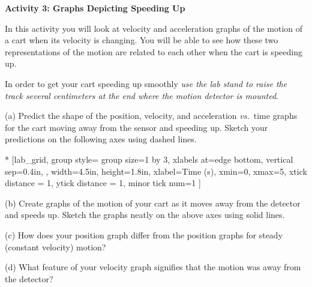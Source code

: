 \pagebreak[2]
\textbf{Activity 3: Graphs Depicting Speeding Up} 

In this activity you will look at velocity and acceleration graphs of the
motion of a cart when its velocity is changing. You will be able to see how
these two representations of the motion are related to each other when the cart
is speeding up.

In order to get your cart speeding up smoothly \textit{use the lab stand to raise the
track several centimeters at the end where the motion detector is mounted}.

(a) Predict the shape of the position, velocity, and acceleration \textit{vs.}~time graphs
for the cart moving away from the sensor and speeding up. Sketch your predictions
on the following axes using dashed lines.



\begin{lab_groupplot}*{}
					[lab_grid,
	group style={
		group size=1 by 3,
		xlabels at=edge bottom,
		vertical sep=0.4in,
		},
	width=4.5in,  height=1.8in,
	xlabel=Time (s),
	xmin=0, xmax=5,
	xtick distance = 1, 
	ytick distance = 1, 
	minor tick num=1
	]
\nextgroupplot[
	ymin=0,ymax=2, 
	ylabel={Position (m)},
	ylabel_align={-1},
	]
\nextgroupplot[
	ymin=-1,ymax=1, 
	ylabel={Velocity (m/s)},
	]
\nextgroupplot[
	ymin=-1,ymax=1, 
	ylabel={Acceleration (m/s$^2$)},
	]
\end{lab_groupplot}



(b) Create graphs of the motion of your cart as it moves away from the detector
and speeds up. Sketch the graphs neatly on the above axes using solid lines.

\pagebreak[2]
(c) How does your position graph differ from the position graphs for steady
(constant velocity) motion? 
\vspace{13mm}

(d) What feature of your velocity graph signifies that the motion was away from
the detector? 
\vspace{13mm}

